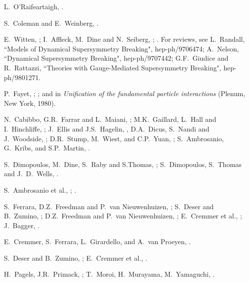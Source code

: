\begin{thebibliography}{99}
L.~O'Raifeartaigh, .

 S.~Coleman and E.~Weinberg,
.

E.~Witten, ;
I.~Affleck, M.~Dine and N.~Seiberg, ;
.
For reviews, see
L.~Randall, ``Models of Dynamical Supersymmetry Breaking", hep-ph/9706474;
A.~Nelson, ``Dynamical Supersymmetry Breaking", hep-ph/9707442;
G.F.~Giudice and R.~Rattazzi, ``Theories with Gauge-Mediated Supersymmetry
Breaking", hep-ph/9801271.

 P.~Fayet, ;
; and in {\em Unification of the fundamental
particle interactions} (Plenum, New York, 1980).

 N.~Cabibbo, G.R.~Farrar and L.~Maiani,
; M.K.~Gaillard, L.~Hall and
I.~Hinchliffe, ;
J.~Ellis and J.S.~Hagelin, ,
D.A.~Dicus, S.~Nandi and J.~Woodside, ;
D.R.~Stump, M.~Wiest, and C.P.~Yuan, ;
S.~Ambrosanio, G.~Kribs, and S.P.~Martin, .

 S.~Dimopoulos, M.~Dine, S.~Raby and S.Thomas,
; S.~Dimopoulos, S.~Thomas and J.~D.~Wells,
.

 S.~Ambrosanio et al.,
; 
.

 S.~Ferrara, D.Z.~Freedman and P.~van
Nieuwenhuizen,
; S.~Deser and B.~Zumino,
; D.Z.~Freedman and  P.~van
Nieuwenhuizen, ;
E.~Cremmer et al., ;
J.~Bagger, .

E.~Cremmer, S.~Ferrara, L.~Girardello, and A.~van Proeyen,
.

 S.~Deser and B.~Zumino,
;
E.~Cremmer et al., .

H.~Pagels, J.R.~Primack, ;
T.~Moroi, H.~Murayama, M.~Yamaguchi, .


\end{thebibliography}
